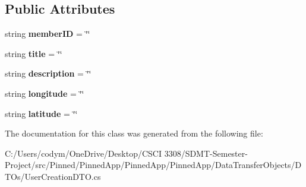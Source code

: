 \subsection*{Public Attributes}
\begin{DoxyCompactItemize}
\item 
\mbox{\label{class_pinned_app_1_1_user_creation_d_t_o_a6f53530f33486fa0524ec4fdd49421bc}} 
string {\bfseries member\+ID} = \char`\"{}\char`\"{}
\item 
\mbox{\label{class_pinned_app_1_1_user_creation_d_t_o_a838045fe3d4ceb59b2b15cd1757713b4}} 
string {\bfseries title} = \char`\"{}\char`\"{}
\item 
\mbox{\label{class_pinned_app_1_1_user_creation_d_t_o_a21d5b66e8e27fa37a5d5f95aa2e891f2}} 
string {\bfseries description} = \char`\"{}\char`\"{}
\item 
\mbox{\label{class_pinned_app_1_1_user_creation_d_t_o_afd54340d9f62b18653e4e9d6b671549b}} 
string {\bfseries longitude} = \char`\"{}\char`\"{}
\item 
\mbox{\label{class_pinned_app_1_1_user_creation_d_t_o_ab50e54b1350d24147c8bf67438da7a83}} 
string {\bfseries latitude} = \char`\"{}\char`\"{}
\end{DoxyCompactItemize}


The documentation for this class was generated from the following file\+:\begin{DoxyCompactItemize}
\item 
C\+:/\+Users/codym/\+One\+Drive/\+Desktop/\+C\+S\+C\+I 3308/\+S\+D\+M\+T-\/\+Semester-\/\+Project/src/\+Pinned/\+Pinned\+App/\+Pinned\+App/\+Pinned\+App/\+Data\+Transfer\+Objects/\+D\+T\+Os/User\+Creation\+D\+T\+O.\+cs\end{DoxyCompactItemize}
